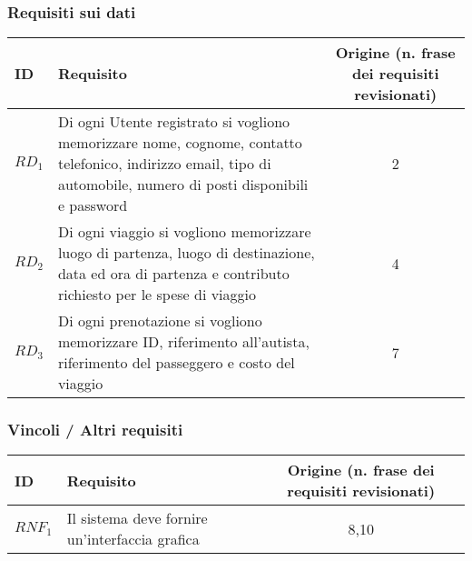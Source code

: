\subsubsection{Requisiti sui dati}

\begin{tabularx}{\textwidth}{|A|X|C|}
\hline
ID & Requisito & Origine (n. frase dei requisiti revisionati) \\ \hline
$RD_{1}$ & Di ogni Utente registrato si vogliono memorizzare nome, cognome, contatto telefonico, indirizzo email, tipo di automobile, numero di posti disponibili e password & 2 \\ \hline
$RD_{2}$ & Di ogni viaggio si vogliono memorizzare luogo di partenza, luogo di destinazione, data ed ora di partenza e contributo richiesto per le spese di viaggio & 4 \\ \hline
$RD_{3}$ & Di ogni prenotazione si vogliono memorizzare ID, riferimento all'autista, riferimento del passeggero e costo del viaggio & 7 \\ \hline
\end{tabularx}

\subsubsection{Vincoli / Altri requisiti}

\begin{tabularx}{\textwidth}{|A|X|C|}
\hline
ID & Requisito & Origine (n. frase dei requisiti revisionati) \\ \hline
$RNF_{1}$ & Il sistema deve fornire un'interfaccia grafica & 8,10 \\ \hline
\end{tabularx}